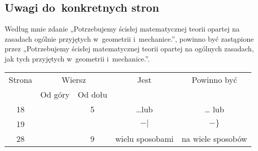 \documentclass[a4paper,11pt]{article}
\numberwithin{equation}{section}
\begin{document}
\label{sec:Feller-Wstep-do-rachunku-ETC}



\subsection{Uwagi do~konkretnych stron}

\label{subsec:Uwagi-do-konkretnych-stron}



\noindent
{} Według mnie zdanie „Potrzebujemy ścisłej
matematycznej teorii opartej na zasadach ogólnie przyjętych w~geometrii
i~mechanice.”, powinno być zastąpione przez „Potrzebujemy ścisłej
matematycznej teorii opartej na ogólnych zasadach, jak tych przyjętych
w~geometrii i~mechanice.”.





\begin{center}

  \begin{tabular}{|c|c|c|c|c|}
    \hline
    Strona & \multicolumn{2}{c|}{Wiersz} & Jest
                              & Powinno być \\ \cline{2-3}
    & Od góry & Od dołu & & \\
    \hline
    18 & & 5 & \ldots lub & \ldots{} lub \\
    19 & & & $- |$ & $- \}$ \\
    28 & & 9 & wielu sposobami & na wiele sposobów \\
    \hline
  \end{tabular}

\end{center}

\VerSpaceSix
















{}






\end{document}

